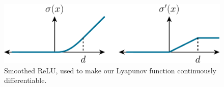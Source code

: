 \begin{figure}
    \centering
    \includegraphics[width=.5\textwidth]{LSDDM/figures/rehu.pdf}
    \caption{Smoothed ReLU, used to make our Lyapunov function continuously differentiable.}
    \label{fig:rehu}
\end{figure}
